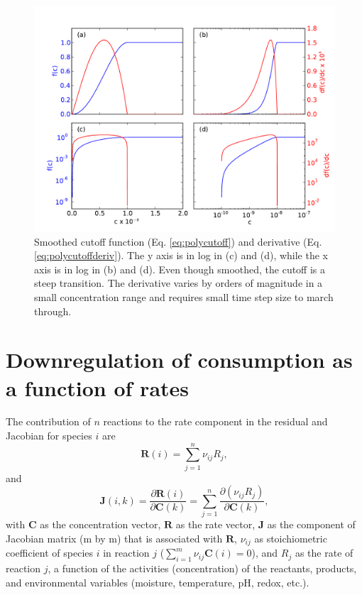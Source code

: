 \documentclass[gmd, manuscript]{copernicus}
\begin{document}
\begin{figure}[h]
\includegraphics[width=1.0\textwidth]{../figs/fig02/fig02cutoff.pdf}
\caption{Smoothed cutoff function (Eq. \ref{eq:polycutoff}) and derivative (Eq.
\ref{eq:polycutoffderiv}). The y axis is in log in (c) and (d), while the x
axis is in log in (b) and (d). Even though smoothed, the cutoff is a steep
transition. The derivative varies by orders of magnitude in a small
concentration range and requires small time step size to march through.}
\label{fig:cutoff}
\end{figure}

\section{Downregulation of consumption as a function of rates}    %
\label{sec:drimpl}
The contribution of $n$ reactions to the rate component in the residual and
Jacobian for species $i$ are
\begin{equation}
\mathbf{R}(i)=\sum_{j=1}^n \nu_{ij} R_j,
\end{equation}
and
\begin{equation}
\mathbf{J}(i,k)=\frac{\partial \mathbf{R}(i)}{\partial \mathbf{C}(k)} =
\sum_{j=1}^n \frac{\partial (\nu_{ij} R_j)}{\partial \mathbf{C}(k)},
\end{equation}
with $\mathbf{C}$ as the concentration vector, $\mathbf{R}$ as the rate vector,
$\mathbf{J}$ as the component of Jacobian matrix (m by m) that is associated
with $\mathbf{R}$, $\nu_{ij}$ as stoichiometric coefficient of species $i$ in
reaction $j$ ($\sum_{i=1}^m \nu_{ij} \mathbf{C}(i) = 0$), and $R_j$ as the rate of
reaction $j$, a function of the activities (concentration) of the reactants,
products, and environmental variables (moisture, temperature, pH, redox, etc.).
\end{document}
